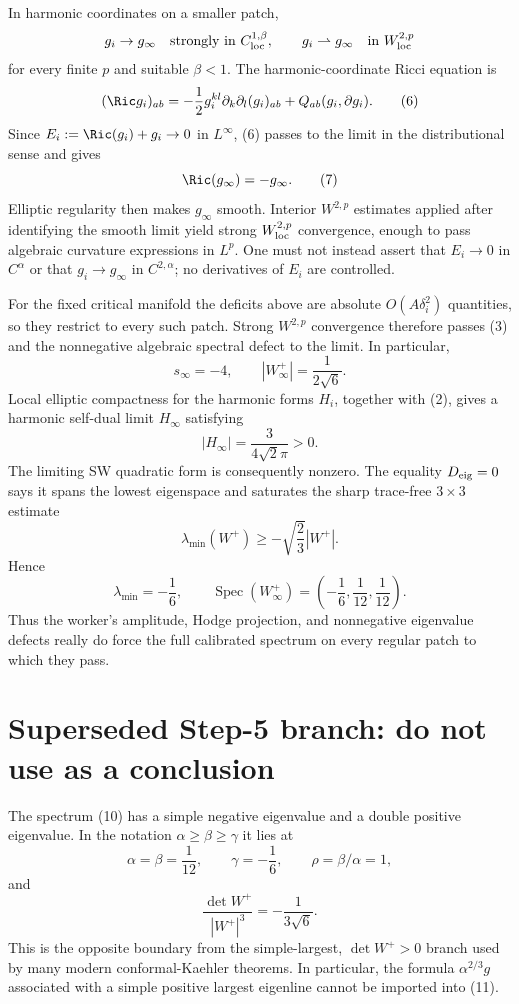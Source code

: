 In harmonic coordinates on a smaller patch,
\[
 g_i\to g_\infty\quad\hbox{strongly in }C^{1,\beta}_{\rm loc},
 \qquad g_i\rightharpoonup g_\infty\quad\hbox{in }W^{2,p}_{\rm loc}
\]
for every finite $p$ and suitable $\beta<1$.  The harmonic-coordinate
Ricci equation is
\[
 (\Ric g_i)_{ab}=-\frac12g_i^{kl}\partial_k\partial_l(g_i)_{ab}
                 +Q_{ab}(g_i,\partial g_i).                  \tag{6}
\]
Since $E_i:=\Ric(g_i)+g_i\to0$ in $L^\infty$, (6) passes to the limit in
the distributional sense and gives
\[
 \Ric(g_\infty)=-g_\infty.                                  \tag{7}
\]
Elliptic regularity then makes $g_\infty$ smooth.  Interior $W^{2,p}$
estimates applied after identifying the smooth limit yield strong
$W^{2,p}_{\rm loc}$ convergence, enough to pass algebraic curvature
expressions in $L^p$.  One must not instead assert that $E_i\to0$ in
$C^\alpha$ or that $g_i\to g_\infty$ in $C^{2,\alpha}$; no derivatives of
$E_i$ are controlled.

For the fixed critical manifold the deficits above are absolute
$O(A\delta_i^2)$ quantities, so they restrict to every such patch.  Strong
$W^{2,p}$ convergence therefore passes (3) and the nonnegative algebraic
spectral defect to the limit.  In particular,
\[
 s_\infty=-4,\qquad |W^+_\infty|=\frac1{2\sqrt6}.             \tag{8}
\]
Local elliptic compactness for the harmonic forms $H_i$, together with
(2), gives a harmonic self-dual limit $H_\infty$ satisfying
\[
 |H_\infty|=\frac{3}{4\sqrt2\pi}>0.                          \tag{9}
\]
The limiting SW quadratic form is consequently nonzero.  The equality
$D_{\rm eig}=0$ says it spans the lowest eigenspace and saturates the sharp
trace-free $3\times3$ estimate
\[
 \lambda_{\min}(W^+)\ge-\sqrt{\frac23}|W^+|.
\]
Hence
\[
 \lambda_{\min}=-\frac16,
 \qquad
 \operatorname{Spec}(W^+_\infty)
   =\left(-\frac16,\frac1{12},\frac1{12}\right).             \tag{10}
\]
Thus the worker's amplitude, Hodge projection, and nonnegative eigenvalue
defects really do force the full calibrated spectrum on every regular
patch to which they pass.

\section{Superseded Step-5 branch: do not use as a conclusion}
The spectrum (10) has a simple negative eigenvalue and a double positive
eigenvalue.  In the notation $\alpha\ge\beta\ge\gamma$ it lies at
\[
 \alpha=\beta=\frac1{12},\qquad \gamma=-\frac16,
 \qquad \rho=\beta/\alpha=1,                                \tag{11}
\]
and
\[
 \frac{\det W^+}{|W^+|^3}=-\frac1{3\sqrt6}.                  \tag{12}
\]
This is the opposite boundary from the simple-largest, $\det W^+>0$
branch used by many modern conformal-Kaehler theorems.  In particular, the
formula $\alpha^{2/3}g$ associated with a simple positive largest
eigenline cannot be imported into (11).

